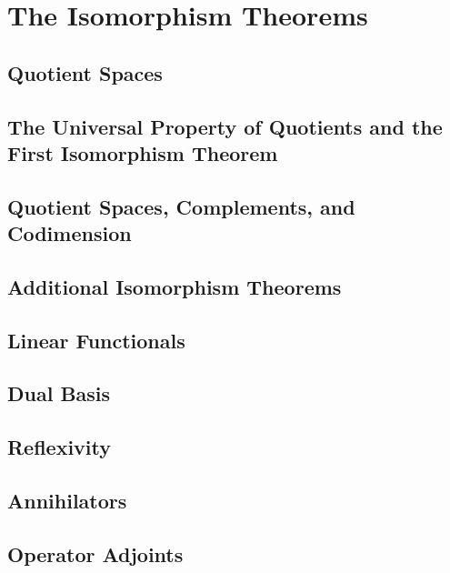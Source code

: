 \chapter{The Isomorphism Theorems}
\section{Quotient Spaces}
\section{The Universal Property of Quotients and the First Isomorphism Theorem}
\section{Quotient Spaces, Complements, and Codimension}
\section{Additional Isomorphism Theorems}
\section{Linear Functionals}
\section{Dual Basis}
\section{Reflexivity}
\section{Annihilators}
\section{Operator Adjoints}


